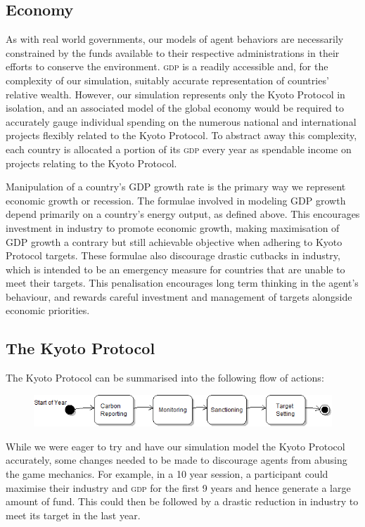 \subsection{Economy}

As with real world governments, our models of agent behaviors are necessarily constrained by the funds available to their respective administrations in their efforts to conserve the environment. \textsc{gdp} is a readily accessible and, for the complexity of our simulation, suitably accurate representation of countries' relative wealth. However, our simulation represents only the Kyoto Protocol in isolation, and an associated model of the global economy would be required to accurately gauge individual spending on the numerous national and international projects flexibly related to the Kyoto Protocol. To abstract away this complexity, each country is allocated a portion of its \textsc{gdp} every year as spendable income on projects relating to the Kyoto Protocol.

Manipulation of a country's GDP growth rate is the primary way we represent economic growth or recession. The formulae involved in modeling GDP growth depend primarily on a country's energy output, as defined above. This encourages investment in industry to promote economic growth, making maximisation of GDP growth a contrary but still achievable objective when adhering to Kyoto Protocol targets. These formulae also discourage drastic cutbacks in industry, which is intended to be an emergency measure for countries that are unable to meet their targets. This penalisation encourages long term thinking in the agent's behaviour, and rewards careful investment and management of targets alongside economic priorities.

\subsection{The Kyoto Protocol}
The Kyoto Protocol can be summarised into the following flow of actions:

\begin{figure}[h!]
	\centering
	\includegraphics[width=\textwidth]{img/Kyoto_4_states.png}
	\caption{}
	\label{fig:kyoto_4_states}
\end{figure}

While we were eager to try and have our simulation model the Kyoto Protocol accurately, some changes needed to be made to discourage agents from abusing the game mechanics. For example, in a 10 year session, a participant could maximise their industry and \textsc{gdp} for the first 9 years and hence generate a large amount of fund. This could then be followed by a drastic reduction in industry to meet its target in the last year.

